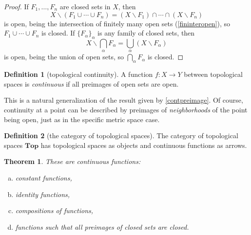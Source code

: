 \documentclass[11pt]{article}
\newtheorem{theorem}{Theorem}[section]
\theoremstyle{definition}
\newtheorem{definition}{Definition}[section]
\theoremstyle{remark}
\begin{document}
\begin{proof}
    If $F_1, \ldots, F_n$ are closed sets in $X$, then
    \[
    X \smallsetminus (F_1 \cup \cdots \cup F_n) = (X \smallsetminus F_1) \cap \cdots \cap (X \smallsetminus F_n)
    \]
    is open, being the intersection of finitely many open sets (\cref{fininteropen}), so $F_1 \cup \cdots \cup F_n$ is closed. If $\{F_\alpha\}_\alpha$ is any family of closed sets, then
    \[
    X \smallsetminus \bigcap_\alpha F_\alpha = \bigcup_\alpha (X \smallsetminus F_\alpha)
    \]
    is open, being the union of open sets, so $\bigcap_\alpha F_\alpha$ is closed.
\end{proof}

\begin{definition}[topological continuity]
    A function $f : X \to Y$ between topological spaces is \emph{continuous} if all preimages of open sets are open.
\end{definition}

This is a natural generalization of the result given by \cref{contpreimage}. Of course, continuity at a point can be described by preimages of \emph{neighborhoods} of the point being open, just as in the specific metric space case.

\begin{definition}[the category of topological spaces]
    The category of topological spaces $\mathbf{Top}$ has topological spaces as objects and continuous functions as arrows.
\end{definition}

\begin{theorem}
    These are continuous functions:
    \begin{enumerate}[(a)]
        \item constant functions,
        \item identity functions,
        \item compositions of functions,
        \item functions such that all preimages of closed sets are closed.
    \end{enumerate}
\end{theorem}
\end{document}
